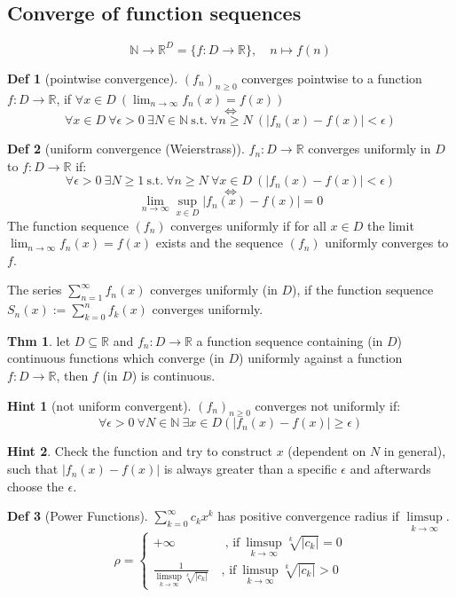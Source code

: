 \documentclass[a4paper, 10pt]{article}
\theoremstyle{definition}
\newtheorem*{theorem}{Thm}
\newtheorem*{definition}{Def}
\newtheorem*{note_wrapper}{Hint}
\theoremstyle{named}
\newenvironment{note}%
    {\begin{mdframed}[style=trick]\begin{note_wrapper}}%
    {\end{note_wrapper}\end{mdframed}}
\newcommand{\R}{\mathbb{R}}
\newcommand{\N}{\mathbb{N}}
\begin{document}
\subsection{Converge of function sequences}
$$\N \to \R^D = \{f: D \to \R\}, \quad n \mapsto f(n)$$
\begin{definition} [pointwise convergence]
    $(f_n)_{n \geq 0}$ converges pointwise to a function $f: D \to \R$, if $\forall x \in D \ (\lim_{n \to \infty} f_n(x) = f(x))$
    $$\iff$$
    $$\forall x \in D \ \forall \epsilon > 0 \ \exists N \in \N \ \text{s.t.} \ \forall n \geq N \ (|f_n(x) - f(x)| < \epsilon)$$
\end{definition}

\begin{definition}[uniform convergence (Weierstrass)]
    $f_n: D \to \R$ converges uniformly in $D$ to $f: D \to \R$ if: 
    $$\forall \epsilon > 0 \ \exists N \geq 1 \ \text{s.t.} \ \forall n \geq N \ \forall x \in D \ (|f_n(x) - f(x)| < \epsilon)$$
    $$\iff$$
    $$\lim_{n\to\infty} \sup_{x \in D} |f_n(x) - f(x)| = 0$$
    The function sequence $(f_n)$ converges uniformly if for all $x \in D$ the limit $\lim_{n\to\infty} f_n(x) = f(x)$ exists and the sequence $(f_n)$ uniformly converges to $f$.

    The series $\sum_{n = 1}^\infty f_n(x)$ converges uniformly (in $D$), if the function sequence $S_n(x) := \sum_{k=0}^n f_k(x)$ converges uniformly.
\end{definition}

\begin{theorem}
    let $D \subseteq \R$ and $f_n: D \to \R$ a function sequence containing (in $D$) continuous functions which converge (in $D$) uniformly against a function $f: D \to \R$, then $f$ (in $D$) is continuous.
\end{theorem}

\begin{note}[not uniform convergent] $(f_n)_{n \geq 0}$ converges not uniformly if:
    $$\forall \epsilon > 0 \ \forall N \in \N \ \exists x \in D (|f_n(x) - f(x)| \geq \epsilon)$$
\end{note}

\begin{note}
    Check the function and try to construct $x$ (dependent on $N$ in general), such that $|f_n(x) - f(x)|$ is always greater than a specific $\epsilon$ and afterwards choose the $\epsilon$.
\end{note}

\begin{definition}[Power Functions]
    $\sum_{k = 0}^\infty c_k x^k$ has positive convergence radius if $\underset{k \to \infty}{\limsup}$.
    $$\rho = \begin{cases}
        + \infty \quad \quad \quad \quad \text{, if} \ \underset{k \to \infty}{\limsup} \sqrt[k]{|c_k|} = 0 \\
        \frac{1}{\underset{k \to \infty}{\limsup} \sqrt[k]{|c_k|}} \quad \text{, if} \ \underset{k \to \infty}{\limsup} \sqrt[k]{|c_k|} > 0
    \end{cases}$$
\end{definition}
\end{document}
